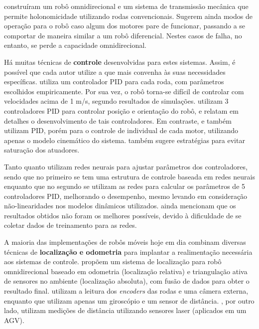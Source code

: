 \citet{jung2001fault} construíram um robô omnidirecional e um sistema de transmissão mecânica que permite holonomicidade utilizando rodas convencionais. Sugerem ainda modos de operação para o robô caso algum dos motores pare de funcionar, passando a se comportar de maneira similar a um robô diferencial. Nestes casos de falha, no entanto, se perde a capacidade omnidirecional.

Há muitas técnicas de \textbf{controle} desenvolvidas para estes sistemas. Assim, é possível que cada autor utilize a que mais convenha às suas necessidades específicas. \citet{ritter2016modelagem} utiliza um controlador PID para cada roda, com parâmetros escolhidos empiricamente. Por sua vez, o robô torna-se difícil de controlar com velocidades acima de 1 m/s, segundo resultados de simulações. \citet{samani2007comprehensive} utilizam 3 controladores PID para controlar posição e orientação do robô, e relatam em detalhes o desenvolvimento de tais controladores. Em contraste, \citet{rojas2006holonomic} e \citet{indiveri2009swedish} também utilizam PID, porém para o controle de individual de cada motor, utilizando apenas o modelo cinemático do sistema. \citet{indiveri2009swedish} também sugere estratégias para evitar saturação dos atuadores.

Tanto \citet{treesatayapun2011discrete} quanto \citet{oubbati2005velocity} utilizam redes neurais para ajustar parâmetros dos controladores, sendo que no primeiro se tem uma estrutura de controle baseada em redes neurais enquanto que no segundo se utilizam as redes para calcular os parâmetros de 5 controladores PID, melhorando o desempenho, mesmo levando em consideração não-linearidades nos modelos dinâmicos utilizados. \citet{oubbati2005velocity} ainda mencionam que os resultados obtidos não foram os melhores possíveis, devido à dificuldade de se coletar dados de treinamento para as redes.

A maioria das implementações de robôs móveis hoje em dia combinam diversas técnicas de \textbf{localização e odometria} para implantar a realimentação necessária aos sistemas de controle. \citet{ginzburg2013indoor} propõem um sistema de localização para robô omnidirecional baseado em odometria (localização relativa) e triangulação ativa de sensores no ambiente (localização absoluta), com fusão de dados para obter o resultado final. \citet{rojas2006holonomic} utilizam a leitura dos \emph{encoders} das rodas e uma câmera externa, enquanto que \citet{garcia2015gyro} utilizam apenas um giroscópio e um sensor de distância. \citet{rohrig2010laser}, por outro lado, utilizam medições de distância utilizando sensores laser (aplicados em um AGV).

